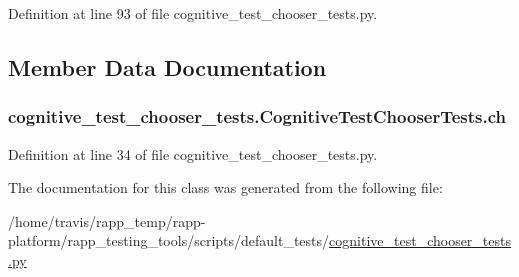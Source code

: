 Definition at line 93 of file cognitive\-\_\-test\-\_\-chooser\-\_\-tests.\-py.



\subsection{Member Data Documentation}
\hypertarget{classcognitive__test__chooser__tests_1_1CognitiveTestChooserTests_ac6866e441eb04b7b7819d8b166f3682c}{
\subsubsection[{ch}]{\setlength{\rightskip}{0pt plus 5cm}cognitive\-\_\-test\-\_\-chooser\-\_\-tests.\-Cognitive\-Test\-Chooser\-Tests.\-ch}}\label{classcognitive__test__chooser__tests_1_1CognitiveTestChooserTests_ac6866e441eb04b7b7819d8b166f3682c}


Definition at line 34 of file cognitive\-\_\-test\-\_\-chooser\-\_\-tests.\-py.



The documentation for this class was generated from the following file\-:\begin{DoxyCompactItemize}
\item 
/home/travis/rapp\-\_\-temp/rapp-\/platform/rapp\-\_\-testing\-\_\-tools/scripts/default\-\_\-tests/\hyperlink{cognitive__test__chooser__tests_8py}{cognitive\-\_\-test\-\_\-chooser\-\_\-tests.\-py}\end{DoxyCompactItemize}
